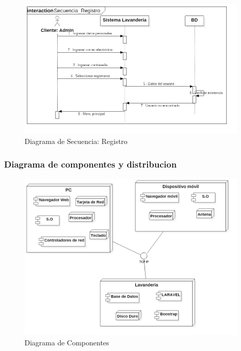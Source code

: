 \begin{figure}[htb]
\begin{center}
\includegraphics[width=11cm]{./imagenes/diagramas/Secuencia_Registro.png}
\end{center}
\caption{Diagrama de Secuencia: Registro}
\end{figure}

\newpage

\subsubsection{Diagrama de componentes y distribucion}


\begin{figure}[htb]
\begin{center}
\includegraphics[width=11cm]{./imagenes/diagramas/Com-Dis_Lavanderia.png}
\end{center}
\caption{Diagrama de Componentes}
\end{figure}





